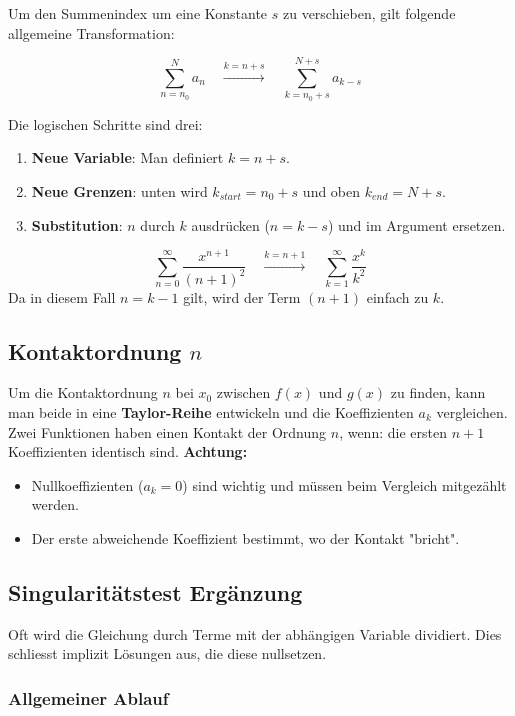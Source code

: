 Um den Summenindex um eine Konstante $s$ zu verschieben, gilt folgende allgemeine Transformation:

\begin{equation*}
\sum_{n=n_0}^{N} a_n \quad \xrightarrow{k = n + s} \quad \sum_{k=n_0+s}^{N+s} a_{k-s}
\end{equation*}

Die logischen Schritte sind drei:
\begin{enumerate}
    \item \textbf{Neue Variable}: Man definiert $k = n + s$.
    \item \textbf{Neue Grenzen}: unten wird $k_{start} = n_0 + s$ und oben $k_{end} = N + s$.
    \item \textbf{Substitution}: $n$ durch $k$ ausdrücken ($n = k - s$) und im Argument ersetzen.
\end{enumerate}

\begin{equation*}
\sum_{n=0}^{\infty} \frac{x^{n+1}}{(n+1)^2} \quad \xrightarrow{k = n + 1} \quad \sum_{k=1}^{\infty} \frac{x^k}{k^2}
\end{equation*}
Da in diesem Fall $n = k - 1$ gilt, wird der Term $(n+1)$ einfach zu $k$.
\subsection{Kontaktordnung $n$}

Um die Kontaktordnung $n$ bei $x_0$ zwischen $f(x)$ und $g(x)$ zu finden, kann man beide in eine \textbf{Taylor-Reihe} entwickeln und die Koeffizienten $a_k$ vergleichen.
Zwei Funktionen haben einen Kontakt der Ordnung $n$, wenn: die ersten $n+1$ Koeffizienten identisch sind.
\textbf{Achtung:} 
\begin{itemize}
    \item Nullkoeffizienten ($a_k = 0$) sind wichtig und müssen beim Vergleich mitgezählt werden.
    \item Der erste abweichende Koeffizient bestimmt, wo der Kontakt "bricht".
\end{itemize}

\subsection{Singularitätstest Ergänzung}\label{chap:sing_erg}
Oft wird die Gleichung durch Terme mit der abhängigen Variable dividiert. Dies schliesst implizit Lösungen aus, die diese nullsetzen.
\subsubsection{Allgemeiner Ablauf}

